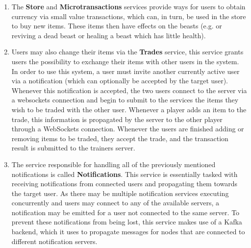 \begin{enumerate}
    \item The \textbf{Store} and \textbf{Microtransactions} services provide ways for users to obtain currency via small value transactions, which can, in turn, be used in the store to buy new items. These items then have effects on the beasts (e.g. or reviving a dead beast or healing a beast which has little health).

    \item Users may also change their items via the \textbf{Trades} service, this service grants users the possibility to exchange their items with other users in the system. In order to use this system, a user must invite another currently active user via a notification (which can optionally be accepted by the target user). Whenever this notification is accepted, the two users connect to the server via a websockets connection and begin to submit to the services the items they wish to be traded with the other user. Whenever a player adds an item to the trade, this information is propagated by the server to the other player through a WebSockets connection. Whenever the users are finished adding or removing items to be traded, they accept the trade, and the transaction result is submitted to the trainers server.

    \item The service responsible for handling all of the previously mentioned notifications is called \textbf{Notifications}. This service is essentially tasked with receiving notifications from connected users and propagating them towards the target user. As there may be multiple notification services executing concurrently and users may connect to any of the available servers, a notification may be emitted for a user not connected to the same server. To prevent these notifications from being lost, this service makes use of a Kafka backend, which it uses to propagate messages for nodes that are connected to different notification servers.


\end{enumerate}
